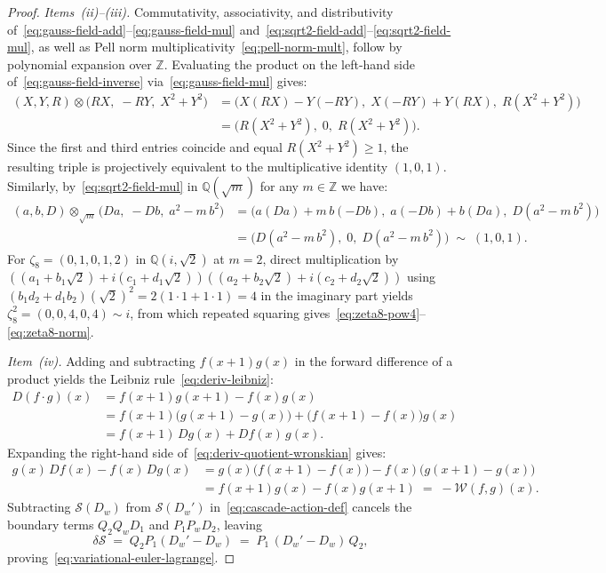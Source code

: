 \documentclass[11pt,a4paper]{article}
\theoremstyle{plain}
\theoremstyle{definition}
\begin{document}
\begin{proof}
\emph{Items~(ii)--(iii).} Commutativity, associativity, and distributivity of~\eqref{eq:gauss-field-add}--\eqref{eq:gauss-field-mul} and~\eqref{eq:sqrt2-field-add}--\eqref{eq:sqrt2-field-mul}, as well as Pell norm multiplicativity~\eqref{eq:pell-norm-mult}, follow by polynomial expansion over $\mathbb{Z}$. Evaluating the product on the left-hand side of~\eqref{eq:gauss-field-inverse} via~\eqref{eq:gauss-field-mul} gives:
\begin{align*}
  (X, Y, R) \otimes \bigl(RX,\; -RY,\; X^2 + Y^2\bigr)
  &= \bigl(X(RX) - Y(-RY),\; X(-RY) + Y(RX),\; R(X^2 + Y^2)\bigr) \\
  &= \bigl(R(X^2 + Y^2),\; 0,\; R(X^2 + Y^2)\bigr).
\end{align*}
Since the first and third entries coincide and equal $R(X^2 + Y^2) \ge 1$, the resulting triple is projectively equivalent to the multiplicative identity $(1, 0, 1)$. Similarly, by~\eqref{eq:sqrt2-field-mul} in $\mathbb{Q}(\sqrt{m})$ for any $m \in \mathbb{Z}$ we have:
\begin{align*}
  (a, b, D) \otimes_{\sqrt{m}} \bigl(Da,\; -Db,\; a^2 - m\,b^2\bigr)
  &= \bigl(a(Da) + m\,b(-Db),\; a(-Db) + b(Da),\; D(a^2 - m\,b^2)\bigr) \\
  &= \bigl(D(a^2 - m\,b^2),\; 0,\; D(a^2 - m\,b^2)\bigr) \;\sim\; (1, 0, 1).
\end{align*}
For $\zeta_8 = (0, 1, 0, 1, 2)$ in $\mathbb{Q}(i, \sqrt{2})$ at $m = 2$, direct multiplication by $((a_1 + b_1\sqrt{2}) + i(c_1 + d_1\sqrt{2}))((a_2 + b_2\sqrt{2}) + i(c_2 + d_2\sqrt{2}))$ using $(b_1 d_2 + d_1 b_2)(\sqrt{2})^2 = 2(1\cdot 1 + 1\cdot 1) = 4$ in the imaginary part yields $\zeta_8^2 = (0, 0, 4, 0, 4) \sim i$, from which repeated squaring gives~\eqref{eq:zeta8-pow4}--\eqref{eq:zeta8-norm}.

\emph{Item~(iv).} Adding and subtracting $f(x+1)g(x)$ in the forward difference of a product yields the Leibniz rule~\eqref{eq:deriv-leibniz}:
\begin{align*}
  D(f\cdot g)(x) &= f(x+1)g(x+1) - f(x)g(x) \\
  &= f(x+1)\bigl(g(x+1) - g(x)\bigr) + \bigl(f(x+1) - f(x)\bigr)g(x) \\
  &= f(x+1)\,Dg(x) + Df(x)\,g(x).
\end{align*}
Expanding the right-hand side of~\eqref{eq:deriv-quotient-wronskian} gives:
\begin{align*}
  g(x)\,Df(x) - f(x)\,Dg(x) &= g(x)\bigl(f(x+1) - f(x)\bigr) - f(x)\bigl(g(x+1) - g(x)\bigr) \\
  &= f(x+1)g(x) - f(x)g(x+1) \;=\; -\mathcal{W}(f, g)(x).
\end{align*}
Subtracting $\mathcal{S}(D_w)$ from $\mathcal{S}(D_w')$ in~\eqref{eq:cascade-action-def} cancels the boundary terms $Q_2 Q_w D_1$ and $P_1 P_w D_2$, leaving
\begin{equation*}
  \delta\mathcal{S} \;=\; Q_2 P_1 (D_w' - D_w) \;=\; P_1\,(D_w' - D_w)\,Q_2,
\end{equation*}
proving~\eqref{eq:variational-euler-lagrange}.


\end{proof}
\end{document}
